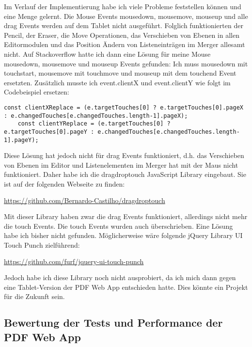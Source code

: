 Im Verlauf der Implementierung habe ich viele Probleme feststellen können und eine Menge gelernt. Die Mouse Events mousedown, mousemove, mouseup und alle drag Events werden auf dem Tablet nicht ausgeführt. Folglich funktionierten der Pencil, der Eraser, die Move Operationen, das Verschieben von Ebenen in allen Editormodulen und das Position Ändern von Listeneinträgen im Merger allesamt nicht. Auf Stackoverflow hatte ich dann eine Lösung für meine Mouse mousedown, mousemove und mouseup Events gefunden: Ich muss mousedown mit touchstart, mousemove mit touchmove und mouseup mit dem touchend Event ersetzten. Zusätzlich musste ich event.clientX und event.clientY wie folgt im Codebeispiel ersetzen:

\begin{lstlisting}[caption=e.clientX und e.clientY Ersetzung]
	const clientXReplace = (e.targetTouches[0] ? e.targetTouches[0].pageX : e.changedTouches[e.changedTouches.length-1].pageX);
	const clientYReplace = (e.targetTouches[0] ? e.targetTouches[0].pageY : e.changedTouches[e.changedTouches.length-1].pageY);
\end{lstlisting} 

Diese Lösung hat jedoch nicht für drag Events funktioniert, d.h. das Verschieben von Ebenen im Editor und Listenelementen im Merger hat mit der Maus nicht funktioniert. Daher habe ich die dragdroptouch JavaScript Library eingebaut. Sie ist auf der folgenden Webseite zu finden:

\url{https://github.com/Bernardo-Castilho/dragdroptouch}

Mit dieser Library haben zwar die drag Events funktioniert, allerdings nicht mehr die touch Events. Die touch Events wurden auch überschrieben. Eine Lösung habe ich bisher nicht gefunden. Möglicherweise wäre folgende jQuery Library UI Touch Punch zielführend:

\url{https://github.com/furf/jquery-ui-touch-punch}

Jedoch habe ich diese Library noch nicht ausprobiert, da ich mich dann gegen eine Tablet-Version der PDF Web App entschieden hatte. Dies könnte ein Projekt für die Zukunft sein.


\subsection{Bewertung der Tests und Performance der PDF Web App}


